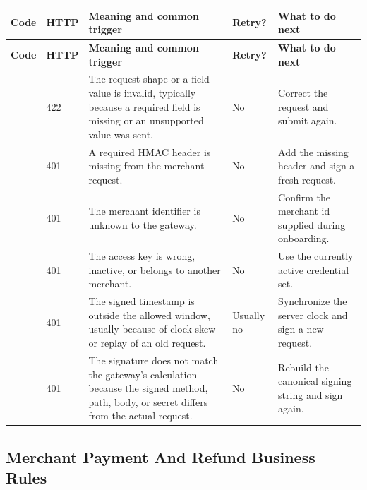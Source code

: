 {\footnotesize
\setlength{\tabcolsep}{4pt}
\begin{longtable}{@{}L{0.21\textwidth}L{0.07\textwidth}L{0.36\textwidth}L{0.08\textwidth}L{0.18\textwidth}@{}}
\toprule
\textbf{Code} & \textbf{HTTP} & \textbf{Meaning and common trigger} &
\textbf{Retry?} & \textbf{What to do next} \\
\midrule
\endfirsthead
\toprule
\textbf{Code} & \textbf{HTTP} & \textbf{Meaning and common trigger} &
\textbf{Retry?} & \textbf{What to do next} \\
\midrule
\endhead
{} & 422 & The request shape or a field value is invalid,
typically because a required field is missing or an unsupported value was sent.
& No & Correct the request and submit again. \\
\bodyrowrule
{} & 401 & A required HMAC header is missing from the
merchant request. & No & Add the missing header and sign a fresh request. \\
\bodyrowrule
{} & 401 & The merchant identifier is unknown to the
gateway. & No & Confirm the merchant id supplied during onboarding. \\
\bodyrowrule
{} & 401 & The access key is wrong, inactive, or
belongs to another merchant. & No & Use the currently active credential set. \\
\bodyrowrule
{} & 401 & The signed timestamp is outside the
allowed window, usually because of clock skew or replay of an old request. &
Usually no & Synchronize the server clock and sign a new request. \\
\bodyrowrule
{} & 401 & The signature does not match the gateway's
calculation because the signed method, path, body, or secret differs from the
actual request. & No & Rebuild the canonical signing string and sign again. \\
\bottomrule
\end{longtable}
}

\subsection{Merchant Payment And Refund Business Rules}

